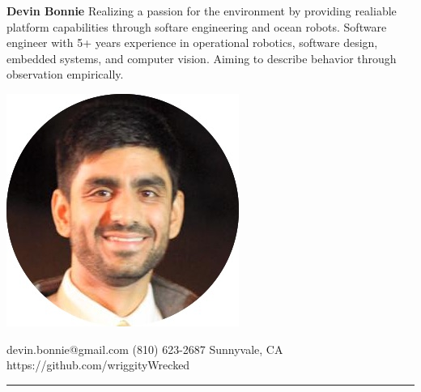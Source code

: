 \documentclass{article}
\begin{document}
\renewcommand{\labelitemi}{\tiny$\bullet$}
{
%
\hspace{-10px}
\begin{minipage}[t]{0.33\textwidth}
\begin{flushleft}
\noindent
\textbf{\large{Devin Bonnie}}
\vspace{4px}
\linebreak
\noindent
\small{Realizing a passion for the environment by providing realiable platform capabilities through softare engineering and ocean robots. Software engineer with 5+ years experience in operational robotics, software design, embedded systems, and computer vision. Aiming to describe behavior through observation empirically.}
\vspace*{1\baselineskip}
\end{flushleft}
\end{minipage}
\begin{minipage}[c]{0.33\textwidth}
\begin{center}
\includegraphics[trim= 0cm 8cm 0 0cm,scale=0.34]{dbCircle}
\end{center}
\end{minipage}
\begin{minipage}[t]{0.33\textwidth}
\begin{flushright}
\vspace*{1.5\baselineskip}
devin.bonnie@gmail.com
 \vspace{2px}
\linebreak
(810) 623-2687
 \vspace{2px}
\linebreak
Sunnyvale, CA 
 \vspace{2px}
\linebreak
https://github.com/wriggityWrecked
\linebreak
\end{flushright}
\end{minipage}
%
\linebreak
\rule{555px}{0.4pt}

}
\end{document}
